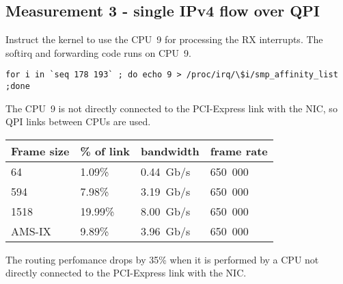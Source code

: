 
\subsection{Measurement 3 - single IPv4 flow over QPI}
Instruct the kernel to use the CPU~9 for processing the RX interrupts.
The softirq and forwarding code runs on CPU~9.
\begin{lstlisting}
for i in `seq 178 193` ; do echo 9 > /proc/irq/\$i/smp_affinity_list ;done
\end{lstlisting}
The CPU~9 is not directly connected to the PCI-Express link with the NIC,
so QPI links between CPUs are used.

\begin{tabular}{ | l | l | l | l | }
\hline
Frame size & \% of link & bandwidth & frame rate \\
\hline
64     &  1.09\% &  0.44~Gb/s & 650~000 \\
594    &  7.98\% &  3.19~Gb/s & 650~000 \\
1518   & 19.99\% &  8.00~Gb/s & 650~000 \\
AMS-IX &  9.89\% &  3.96~Gb/s & 650~000 \\
\hline
\end{tabular}
The routing perfomance drops by 35\% when it is performed by
a CPU not directly connected to the PCI-Express link with the NIC.

